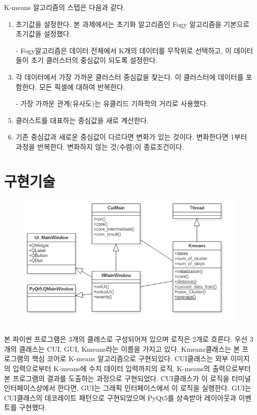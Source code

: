 \documentclass{oblivoir}
\begin{document}
K-means 알고리즘의 스텝은 다음과 같다.
\begin{enumerate}
	\item 초기값을 설정한다. 본 과제에서는 초기화 알고리즘인 Fogy 알고리즘을 기본으로 초기값을 설정했다.
	\item[-] Fogy알고리즘은 데이터 전체에서 K개의 데이터를 무작위로 선택하고, 이 데이터들이 초기 클러스터의 중심값이 되도록 설정한다.
	\item 각 데이터에서 가장 가까운 클러스터 중심값을 찾는다. 이 클러스터에 데이터를 포함한다. 모든 픽셀에 대하여 반복한다.
	\item[-] 가장 가까운 관계(유사도)는 유클리드 기하학의 거리로 사용했다.
	\item 클러스트를 대표하는 중심값을 새로 계산한다.
	\item 기존 중심값과 새로운 중심값이 다르다면 변화가 있는 것이다. 변화한다면 1부터 과정을 반복한다. 변화하지 않는 것(수렴)이 종료조건이다.
\end{enumerate}



\section{구현기술 \label{ss:add}}
\begin{figure}
	\begin{center}
		\includegraphics[scale=0.5]{uml.png}
	\end{center}
\end{figure}

본 파이썬 프로그램은 3개의 클래스로 구성되어져 있으며 로직은 2개로 흐른다. 우선 3개의 클래스는 CUI, GUI, Kmeans라는 이름을 가지고 있다. Kmeans클래스는 본 프로그램의 핵심 코어로 K-means 알고리즘으로 구현되있다. CUI클래스는 외부 이미지의 입력으로부터 K-means에 수치 데이터 입력까지의 로직, K-means의 출력으로부터 본 프로그램의 결과를 도출하는 과정으로 구현되었다. CUI클래스가 이 로직을 터미널 인터페이스상에서 한다면, GUI는 그래픽 인터페이스에서 이 로직을 실행한다. GUI는 CUI클래스의 데코레이트 패턴으로 구현되었으며 PyQt5를 상속받아 레이아웃과 이벤트를 구현했다.\\
\end{document}
